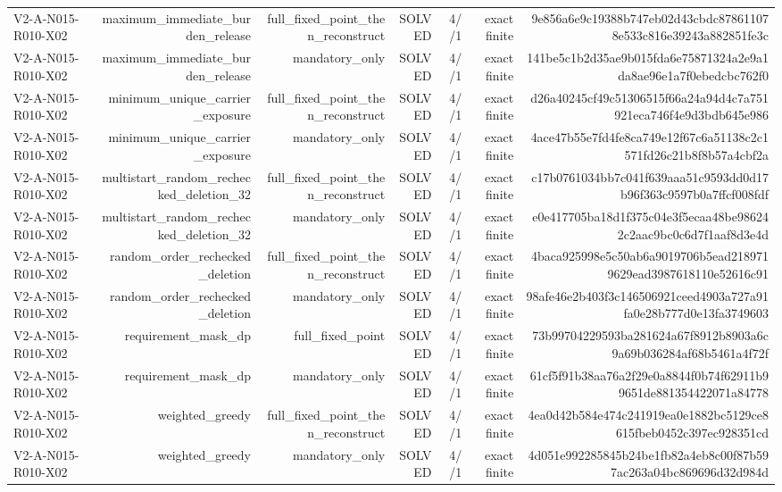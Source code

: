 {\begin{longtable}{lrrrrrr}
V2-A-N015-R010-X02 & maximum\_immediate\_burden\_release & full\_fixed\_point\_then\_reconstruct & SOLVED & 4//1 & exact finite & 9e856a6e9c19388b747eb02d43cbdc878611078e533c816e39243a882851fe3c \\
V2-A-N015-R010-X02 & maximum\_immediate\_burden\_release & mandatory\_only & SOLVED & 4//1 & exact finite & 141be5c1b2d35ae9b015fda6e75871324a2e9a1da8ae96e1a7f0ebedcbc762f0 \\
V2-A-N015-R010-X02 & minimum\_unique\_carrier\_exposure & full\_fixed\_point\_then\_reconstruct & SOLVED & 4//1 & exact finite & d26a40245cf49c51306515f66a24a94d4c7a751921eca746f4e9d3bdb645e986 \\
V2-A-N015-R010-X02 & minimum\_unique\_carrier\_exposure & mandatory\_only & SOLVED & 4//1 & exact finite & 4ace47b55e7fd4fe8ca749e12f67c6a51138c2c1571fd26c21b8f8b57a4cbf2a \\
V2-A-N015-R010-X02 & multistart\_random\_rechecked\_deletion\_32 & full\_fixed\_point\_then\_reconstruct & SOLVED & 4//1 & exact finite & c17b0761034bb7c041f639aaa51c9593dd0d17b96f363c9597b0a7ffcf008fdf \\
V2-A-N015-R010-X02 & multistart\_random\_rechecked\_deletion\_32 & mandatory\_only & SOLVED & 4//1 & exact finite & e0e417705ba18d1f375c04e3f5ecaa48be986242c2aac9bc0c6d7f1aaf8d3e4d \\
V2-A-N015-R010-X02 & random\_order\_rechecked\_deletion & full\_fixed\_point\_then\_reconstruct & SOLVED & 4//1 & exact finite & 4baca925998e5c50ab6a9019706b5ead2189719629ead3987618110e52616c91 \\
V2-A-N015-R010-X02 & random\_order\_rechecked\_deletion & mandatory\_only & SOLVED & 4//1 & exact finite & 98afe46e2b403f3c146506921ceed4903a727a91fa0e28b777d0e13fa3749603 \\
V2-A-N015-R010-X02 & requirement\_mask\_dp & full\_fixed\_point & SOLVED & 4//1 & exact finite & 73b99704229593ba281624a67f8912b8903a6c9a69b036284af68b5461a4f72f \\
V2-A-N015-R010-X02 & requirement\_mask\_dp & mandatory\_only & SOLVED & 4//1 & exact finite & 61cf5f91b38aa76a2f29e0a8844f0b74f62911b99651de881354422071a84778 \\
V2-A-N015-R010-X02 & weighted\_greedy & full\_fixed\_point\_then\_reconstruct & SOLVED & 4//1 & exact finite & 4ea0d42b584e474c241919ea0e1882bc5129ce8615fbeb0452c397ec928351cd \\
V2-A-N015-R010-X02 & weighted\_greedy & mandatory\_only & SOLVED & 4//1 & exact finite & 4d051e992285845b24be1fb82a4eb8c00f87b597ac263a04bc869696d32d984d \\

\end{longtable}}
